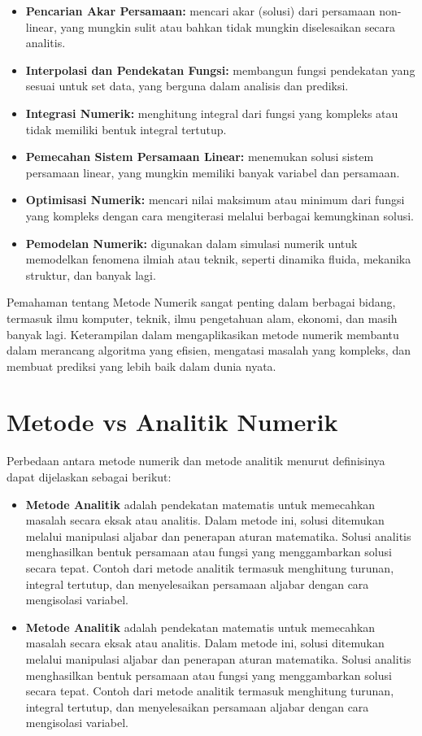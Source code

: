 \documentclass[
]{book}
\providecommand{\tightlist}{%
  \setlength{\itemsep}{0pt}\setlength{\parskip}{0pt}}
\theoremstyle{definition}
\theoremstyle{definition}
\theoremstyle{definition}
\theoremstyle{definition}
\theoremstyle{remark}
\begin{document}
\begin{itemize}
\tightlist
\item
  \textbf{Pencarian Akar Persamaan:} mencari akar (solusi) dari persamaan non-linear, yang mungkin sulit atau bahkan tidak mungkin diselesaikan secara analitis.
\item
  \textbf{Interpolasi dan Pendekatan Fungsi:} membangun fungsi pendekatan yang sesuai untuk set data, yang berguna dalam analisis dan prediksi.
\item
  \textbf{Integrasi Numerik:} menghitung integral dari fungsi yang kompleks atau tidak memiliki bentuk integral tertutup.
\item
  \textbf{Pemecahan Sistem Persamaan Linear:} menemukan solusi sistem persamaan linear, yang mungkin memiliki banyak variabel dan persamaan.
\item
  \textbf{Optimisasi Numerik:} mencari nilai maksimum atau minimum dari fungsi yang kompleks dengan cara mengiterasi melalui berbagai kemungkinan solusi.
\item
  \textbf{Pemodelan Numerik:} digunakan dalam simulasi numerik untuk memodelkan fenomena ilmiah atau teknik, seperti dinamika fluida, mekanika struktur, dan banyak lagi.
\end{itemize}

Pemahaman tentang Metode Numerik sangat penting dalam berbagai bidang, termasuk ilmu komputer, teknik, ilmu pengetahuan alam, ekonomi, dan masih banyak lagi. Keterampilan dalam mengaplikasikan metode numerik membantu dalam merancang algoritma yang efisien, mengatasi masalah yang kompleks, dan membuat prediksi yang lebih baik dalam dunia nyata.

\hypertarget{metode-vs-analitik-numerik}{%
\section{Metode vs Analitik Numerik}\label{metode-vs-analitik-numerik}}

Perbedaan antara metode numerik dan metode analitik menurut definisinya dapat dijelaskan sebagai berikut:

\begin{itemize}
\tightlist
\item
  \textbf{Metode Analitik} adalah pendekatan matematis untuk memecahkan masalah secara eksak atau analitis. Dalam metode ini, solusi ditemukan melalui manipulasi aljabar dan penerapan aturan matematika. Solusi analitis menghasilkan bentuk persamaan atau fungsi yang menggambarkan solusi secara tepat. Contoh dari metode analitik termasuk menghitung turunan, integral tertutup, dan menyelesaikan persamaan aljabar dengan cara mengisolasi variabel.
\item
  \textbf{Metode Analitik} adalah pendekatan matematis untuk memecahkan masalah secara eksak atau analitis. Dalam metode ini, solusi ditemukan melalui manipulasi aljabar dan penerapan aturan matematika. Solusi analitis menghasilkan bentuk persamaan atau fungsi yang menggambarkan solusi secara tepat. Contoh dari metode analitik termasuk menghitung turunan, integral tertutup, dan menyelesaikan persamaan aljabar dengan cara mengisolasi variabel.
\end{itemize}
\end{document}
